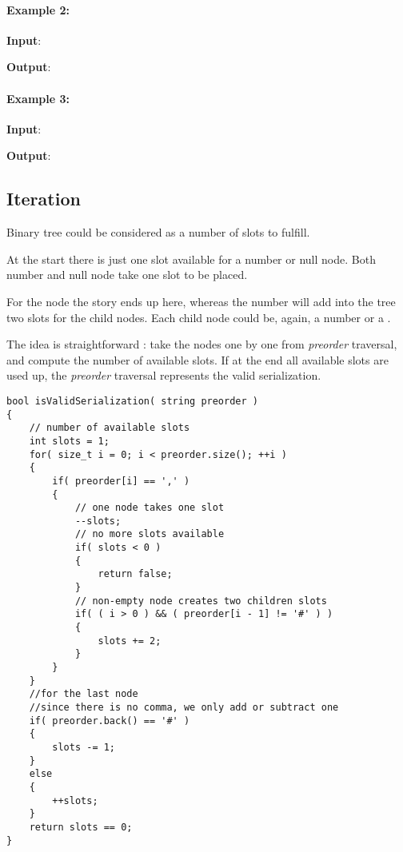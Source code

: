 \paragraph{Example 2:}
\begin{flushleft}
\textbf{Input}: 

\textbf{Output}: 
\end{flushleft}

\paragraph{Example 3:}
\begin{flushleft}
\textbf{Input}: 

\textbf{Output}: 
\end{flushleft}

\subsection{Iteration}
Binary tree could be considered as a number of slots to fulfill. 

At the start there is just one slot available for a number or null node. Both number and null node take one slot to be placed. 

For the  node the story ends up here, whereas the number will add into the tree two slots for the child nodes. Each child node could be, again, a number or a .

The idea is straightforward : take the nodes one by one from \textit{preorder} traversal, and compute the number of available slots. If at the end all available slots are used up, the \textit{preorder} traversal represents the valid serialization.

\setcounter{lstlisting}{0}
\begin{lstlisting}[style=customc, caption={Iteration}]
bool isValidSerialization( string preorder )
{
    // number of available slots
    int slots = 1;
    for( size_t i = 0; i < preorder.size(); ++i )
    {
        if( preorder[i] == ',' )
        {
            // one node takes one slot
            --slots;
            // no more slots available
            if( slots < 0 )
            {
                return false;
            }
            // non-empty node creates two children slots
            if( ( i > 0 ) && ( preorder[i - 1] != '#' ) )
            {
                slots += 2;
            }
        }
    }
    //for the last node
    //since there is no comma, we only add or subtract one
    if( preorder.back() == '#' )
    {
        slots -= 1;
    }
    else
    {
        ++slots;
    }
    return slots == 0;
}
\end{lstlisting}